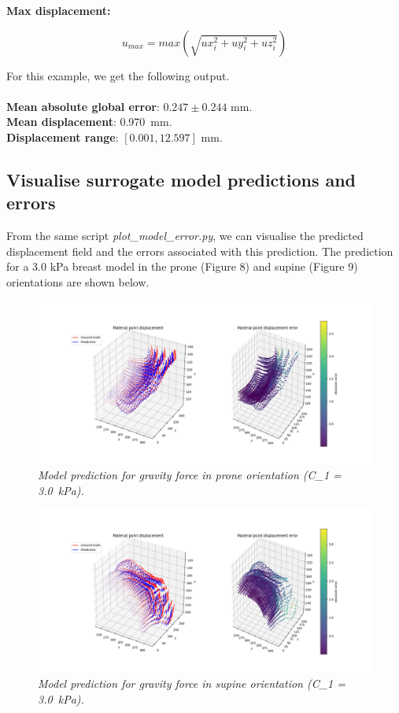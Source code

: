 \documentclass[11pt]{article}
\begin{document}
\textbf{Max displacement: }
\begin{itemize}
    \begin{equation}
        u_{max} = max(\sqrt{ux_{i}^2 + uy_{i}^2 + uz_{i}^2})    
    \end{equation}
\end{itemize}

For this example, we get the following output. \\
\\
\textbf{Mean absolute global error}: $0.247 \pm 0.244$ mm. \\
\textbf{Mean displacement}: \SI{0.970}{mm}. \\
\textbf{Displacement range}: $[0.001, 12.597]$ mm. 

\subsection{Visualise surrogate model predictions and errors}
From the same script \textit{plot\_model\_error.py}, we can visualise the predicted displacement field and the errors associated with this prediction. The prediction for a 3.0 kPa breast model in the prone (Figure 8) and supine (Figure 9) orientations are shown below. 

\begin{figure}
\centering
\includegraphics[scale=1.0]{Images/breast/3.0_prone_model.png}
\caption{\textit{\label{fig8}Model prediction for gravity force in prone orientation (C_1 = \SI{3.0}{kPa}).}}
\end{figure}

\begin{figure}
\centering
\includegraphics[scale=1.0]{Images/breast/3.0_supine_model.png}
\caption{\textit{\label{fig9}Model prediction for gravity force in supine orientation (C_1 = \SI{3.0}{kPa}).}}
\end{figure}
\end{document}
